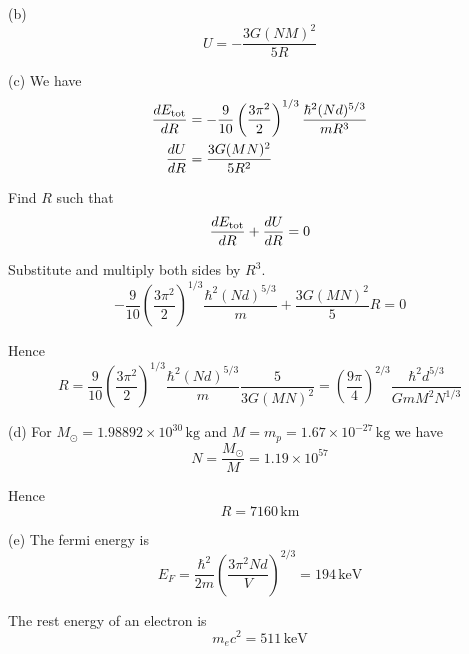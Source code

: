 (b)
\begin{equation*}
U=-\frac{3G(NM)^2}{5R}
\end{equation*}

(c) We have
\begin{align*}
\frac{dE_{\rm tot}}{dR}&=-\frac{9}{10}\left(\frac{3\pi^2}{2}\right)^{1/3}
\frac{\hbar^2(Nd)^{5/3}}{mR^3}
\\
\frac{dU}{dR}&=\frac{3G(MN)^2}{5R^2}
\end{align*}

Find $R$ such that
\begin{equation*}
\frac{dE_{\rm tot}}{dR}+\frac{dU}{dR}=0
\end{equation*}

Substitute and multiply both sides by $R^3$.
\begin{equation*}
-\frac{9}{10}\left(\frac{3\pi^2}{2}\right)^{1/3}
\frac{\hbar^2(Nd)^{5/3}}{m}+\frac{3G(MN)^2}{5}R=0
\end{equation*}

Hence
\begin{equation*}
R=\frac{9}{10}\left(\frac{3\pi^2}{2}\right)^{1/3}\frac{\hbar^2(Nd)^{5/3}}{m}\frac{5}{3G(MN)^2}
=\left(\frac{9\pi}{4}\right)^{2/3}\frac{\hbar^2d^{5/3}}{GmM^2N^{1/3}}
\tag{1}
\end{equation*}

(d) For $M_{\odot}=1.98892\times10^{30}\,\text{kg}$
and $M=m_p=1.67\times10^{-27}\,\text{kg}$ we have
\begin{equation*}
N=\frac{M_{\odot}}{M}=1.19\times10^{57}
\end{equation*}

Hence
\begin{equation*}
R=7160\,\text{km}
\end{equation*}

(e) The fermi energy is
\begin{equation*}
E_F=\frac{\hbar^2}{2m}\left(\frac{3\pi^2Nd}{V}\right)^{2/3}=194\,\text{keV}
\end{equation*}

The rest energy of an electron is
\begin{equation*}
m_ec^2=511\,\text{keV}
\end{equation*}


